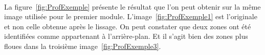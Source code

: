 \documentclass[11pt, french]{report-rd-info}
\begin{document}
\paragraph*{}
La figure~\ref{fig:ProfExemple} présente le résultat que l'on peut obtenir sur la même image utilisée pour le premier module. L'image~\ref{fig:ProfExemple1} est l'originale et non celle obtenue après le lissage. On peut constater que deux zones ont été identifiées comme appartenant à l'arrière-plan. Et il s'agit bien des zones plus floues dans la troisième image~\ref{fig:ProfExemple3}.
\begin{figure}[htp]
 \centering

\end{figure}
\end{document}
